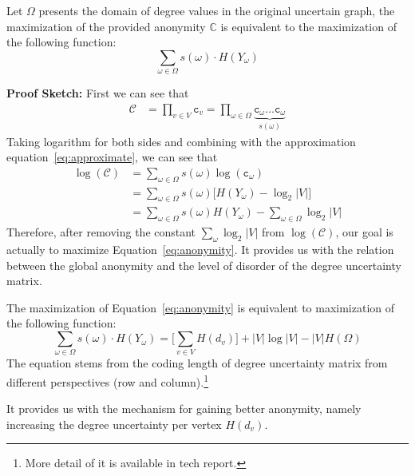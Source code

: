 \begin{theorem}
Let $\Omega$ presents the domain of degree values in the original uncertain graph, the maximization of the provided anonymity $\mathbb{C}$ is equivalent to the maximization of the following function:
  \begin{equation}
      \sum_{\omega \in \Omega} s(\omega) \cdot H(Y_{\omega}) 
      \label{eq:anonymity}
  \end{equation} 
\end{theorem}

{\bf Proof Sketch:} First we can see that 
\begin{align*}
    \mathcal{C} &= \prod_{v \in V} \mathtt{c}_{v} 
                 = \prod_{\omega \in \Omega} \underbrace{\mathtt{c_{\omega}} \ldots \mathtt{c}_{\omega}}_{s(\omega)} 
\end{align*}
Taking logarithm for both sides and combining with the approximation equation~\ref{eq:approximate}, we can see that 
\begin{align*}
    \log(\mathcal{C}) &=\sum_{\omega \in \Omega} s(\omega) \log(\mathtt{c_{\omega}}) \\
                      &=\sum_{\omega \in \Omega} s(\omega) \big[ H(Y_{\omega})-\log_{2}{|V|} \big] \\
                      &=\sum_{\omega  \in \Omega} s(\omega) H(Y_{\omega}) -\sum_{\omega  \in \Omega} \log_{2}{|V|}
\end{align*}
Therefore, after removing the constant $\sum_{\omega} \log_{2}|V|$ from $\log(\mathcal{C})$, our goal is actually to maximize Equation~\ref{eq:anonymity}. It provides us with the relation between the global anonymity and the level of disorder of the degree uncertainty matrix.  

\begin{theorem}
The maximization of Equation~\ref{eq:anonymity} is equivalent to maximization of the following function:
  \begin{equation}
      \sum_{\omega \in \Omega} s(\omega) \cdot H(Y_{\omega}) =\big[ \sum_{v \in V} H(d_{v})\big] + |V|\log{|V|}-|V|H(\Omega)
  \end{equation}
The equation stems from the coding length of degree uncertainty matrix from different perspectives (row and column).\footnote{More detail of it is available in tech report.}
\end{theorem}
It provides us with the mechanism for gaining better anonymity, namely increasing the degree uncertainty per vertex $H(d_{v})$. 

